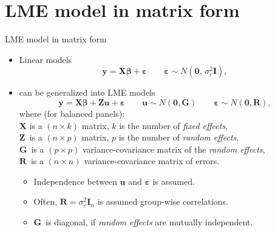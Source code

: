 \documentclass{beamer}
\begin{document}
\section{LME model in matrix form}
\begin{frame}{LME model in matrix form}
\begin{itemize}
\item Linear models 
$$\bm{y} = \bm{X \beta} + \bm{\varepsilon} 
\qquad \bm{\varepsilon} \sim N(\bm{0}, \,\sigma^2_{\varepsilon} \bm{I}),$$

\item can be generalized into LME models
$$\bm{y} = \bm{X \beta} + \bm{Z u} + \bm{\varepsilon} 
\qquad \bm{u} \sim N(\bm{0}, \bm{G})
\qquad \bm{\varepsilon} \sim N(\bm{0}, \bm{R}),$$
where (for balanced panels):\\
$\bm{X}$ is a $(n \! \times \! k)$ matrix, $k$ is the number of \textit{fixed effects},\\
$\bm{Z}\,$ is a $(n \! \times \! p)$ matrix, $p$ is the number of \textit{random effects},\\
$\bm{G}\,$ is a $(p \! \times \! p)$ variance-covariance matrix of the \textit{random effects},\\
$\bm{R}\,$ is a $(n \! \times \! n)$ variance-covariance matrix of errors.\\
\medskip
\begin{itemize}
    \item Independence between $\bm{u}$ and $\bm{\varepsilon}$ is assumed.\\
    \item  Often, $\bm{R}=\sigma^2_{\varepsilon} \bm{I}_n$ is assumed group-wise correlations.\\
    \item $\bm{G}\,$ is diagonal, if \textit{random effects} are mutually independent.
\end{itemize}
\end{itemize}
\end{frame}
\end{document}
